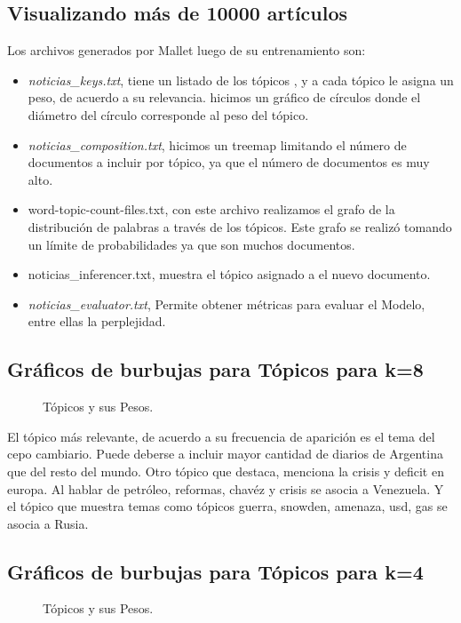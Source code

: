 \documentclass[8.5pt,twoside,twocolumn]{article}
\begin{document}
\subsection{ Visualizando m\'as de 10000 art\'iculos}
Los archivos generados por Mallet luego de su entrenamiento son:
\begin{itemize}
\item \emph{noticias\_keys.txt}, tiene un listado de los t\'opicos , y a cada t\'opico le asigna un peso, de acuerdo a su relevancia. hicimos un gr\'afico de c\'irculos donde el di\'ametro del c\'irculo corresponde al peso del t\'opico.  
\item \emph{noticias\_composition.txt}, hicimos un treemap limitando el n\'umero de documentos a incluir por t\'opico, ya que el n\'umero de documentos es muy alto.
\item word-topic-count-files.txt, con este archivo realizamos el grafo de la distribuci\'on de palabras a trav\'es de los t\'opicos.
      Este grafo se realiz\'o tomando un l\'imite de probabilidades ya que son muchos documentos.
\item noticias\_inferencer.txt, muestra el t\'opico asignado a el nuevo documento.
\item \emph{noticias\_evaluator.txt}, Permite obtener m\'etricas para evaluar el Modelo, entre ellas la perplejidad.
\end{itemize}

\subsection{ Gr\'aficos de burbujas para T\'opicos para k=8  }
\begin{figure}[h]
  \centering
  \caption{T\'opicos y sus Pesos.}  
  \label{fgr:perplexity}
\end{figure}

El t\'opico m\'as relevante, de acuerdo a su frecuencia de aparici\'on es el tema del cepo cambiario.  
Puede deberse a incluir mayor cantidad de diarios de Argentina que del resto del mundo.  
Otro t\'opico que destaca, menciona la crisis y deficit en europa.  
Al hablar de petr\'oleo, reformas, chav\'ez y crisis se asocia a Venezuela. 
Y el t\'opico que muestra temas como t\'opicos guerra, snowden, amenaza, usd, gas se asocia a Rusia.

\subsection{ Gr\'aficos de burbujas para T\'opicos para k=4  }
\begin{figure}[h]
  \centering
  \caption{T\'opicos y sus Pesos.}  
  \label{fgr:burble}
\end{figure}
\end{document}
